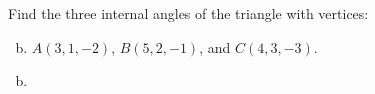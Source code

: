 \documentclass[../main.tex]{subfiles}
\begin{document}
Find the three internal angles of the triangle with vertices:
\begin{enumerate}[a)]
	\setcounter{enumi}{1}
	\item $A(3, 1, -2)$, $B(5, 2, -1)$, and $C(4, 3, -3)$.
\end{enumerate}

\solution
\begin{enumerate}[a)]
	\setcounter{enumi}{1}
	\item 
\end{enumerate}
\end{document}

